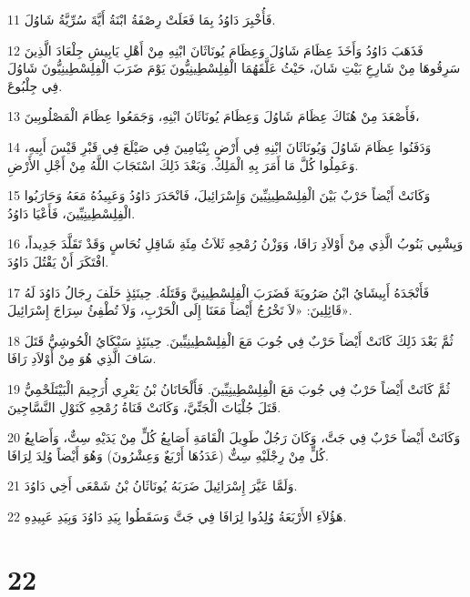 \par 11 فَأُخْبِرَ دَاوُدُ بِمَا فَعَلَتْ رِصْفَةُ ابْنَةُ أَيَّةَ سُرِّيَّةُ شَاوُلَ.
\par 12 فَذَهَبَ دَاوُدُ وَأَخَذَ عِظَامَ شَاوُلَ وَعِظَامَ يُونَاثَانَ ابْنِهِ مِنْ أَهْلِ يَابِيشِ جِلْعَادَ الَّذِينَ سَرِقُوهَا مِنْ شَارِعِ بَيْتِ شَانَ، حَيْثُ عَلَّقَهُمَا الْفِلِسْطِينِيُّونَ يَوْمَ ضَرَبَ الْفِلِسْطِينِيُّونَ شَاوُلَ فِي جِلْبُوعَ.
\par 13 فَأَصْعَدَ مِنْ هُنَاكَ عِظَامَ شَاوُلَ وَعِظَامَ يُونَاثَانَ ابْنِهِ، وَجَمَعُوا عِظَامَ الْمَصْلُوبِينَ،
\par 14 وَدَفَنُوا عِظَامَ شَاوُلَ وَيُونَاثَانَ ابْنِهِ فِي أَرْضِ بِنْيَامِينَ فِي صَيْلَعَ فِي قَبْرِ قَيْسَ أَبِيهِ، وَعَمِلُوا كُلَّ مَا أَمَرَ بِهِ الْمَلِكُ. وَبَعْدَ ذَلِكَ اسْتَجَابَ اللَّهُ مِنْ أَجْلِ الأَرْضِ.
\par 15 وَكَانَتْ أَيْضاً حَرْبٌ بَيْنَ الْفِلِسْطِينِيِّينَ وَإِسْرَائِيلَ، فَانْحَدَرَ دَاوُدُ وَعَبِيدُهُ مَعَهُ وَحَارَبُوا الْفِلِسْطِينِيِّينَ، فَأَعْيَا دَاوُدُ.
\par 16 وَيِشْبِي بَنُوبُ الَّذِي مِنْ أَوْلاَدِ رَافَا، وَوَزْنُ رُمْحِهِ ثَلاَثُ مِئَةِ شَاقِلِ نُحَاسٍ وَقَدْ تَقَلَّدَ جَدِيداً، افْتَكَرَ أَنْ يَقْتُلَ دَاوُدَ.
\par 17 فَأَنْجَدَهُ أَبِيشَايُ ابْنُ صَرُويَةَ فَضَرَبَ الْفِلِسْطِينِيَّ وَقَتَلَهُ. حِينَئِذٍ حَلَفَ رِجَالُ دَاوُدَ لَهُ قَائِلِينَ: «لاَ تَخْرُجُ أَيْضاً مَعَنَا إِلَى الْحَرْبِ، وَلاَ تُطْفِئُ سِرَاجَ إِسْرَائِيلَ».
\par 18 ثُمَّ بَعْدَ ذَلِكَ كَانَتْ أَيْضاً حَرْبٌ فِي جُوبَ مَعَ الْفِلِسْطِينِيِّينَ. حِينَئِذٍ سَبْكَايُ الْحُوشِيُّ قَتَلَ سَافَ الَّذِي هُوَ مِنْ أَوْلاَدِ رَافَا.
\par 19 ثُمَّ كَانَتْ أَيْضاً حَرْبٌ فِي جُوبَ مَعَ الْفِلِسْطِينِيِّينَ. فَأَلْحَانَانُ بْنُ يَعْرِي أُرَجِيمَ الْبَيْتَلَحْمِيُّ قَتَلَ جُلْيَاتَ الْجَتِّيَّ، وَكَانَتْ قَنَاةُ رُمْحِهِ كَنَوْلِ النَّسَّاجِينَ.
\par 20 وَكَانَتْ أَيْضاً حَرْبٌ فِي جَتَّ، وَكَانَ رَجُلٌ طَوِيلَ الْقَامَةِ أَصَابِعُ كُلٍّ مِنْ يَدَيْهِ سِتٌّ، وَأَصَابِعُ كُلٍّ مِنْ رِجْلَيْهِ سِتٌّ (عَدَدُهَا أَرْبَعٌ وَعِشْرُونَ) وَهُوَ أَيْضاً وُلِدَ لِرَافَا.
\par 21 وَلَمَّا عَيَّرَ إِسْرَائِيلَ ضَرَبَهُ يُونَاثَانُ بْنُ شَمْعَى أَخِي دَاوُدَ.
\par 22 هَؤُلاَءِ الأَرْبَعَةُ وُلِدُوا لِرَافَا فِي جَتَّ وَسَقَطُوا بِيَدِ دَاوُدَ وَبِيَدِ عَبِيدِهِ.

\chapter{22}

